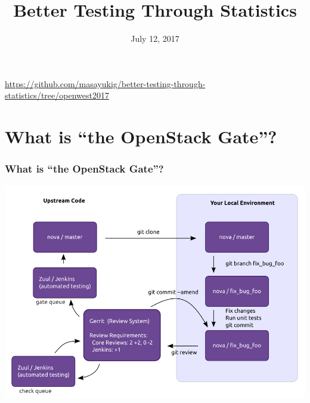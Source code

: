 \documentclass[aspectratio=169,11pt,hyperref={colorlinks=true}]{beamer}
\author[Matthew Treinish & Masayuki Igawa]{%
    \texorpdfstring{%
        \begin{columns}
            \column{.45\linewidth}
            \centering
            Matthew Treinish\\
            Open Source Developer Advocate - IBM
            \href{mailto:mtreinish@kortar.org}{mtreinish@kortar.org}\\
        \texttt{mtreinish on Freenode}
        \column{.45\linewidth}
            \centering
            Masayuki Igawa\\
            \href{mailto:masayuki.igawa@gmail.com}{masayuki.igawa@gmail.com}\\
            \texttt{masayukig on Freenode}
        \end{columns}
        }
    {Matthew Treinish & Masayuki Igawa}
}
\date{July 12, 2017}
\title[Better Testing Through Statistics
\hspace{2em}\insertframenumber/\inserttotalframenumber]{Better Testing Through Statistics}
\begin{document}
{%
\begin{frame}[noframenumbering]
    \hypersetup{colorlinks,urlcolor=white}
    \titlepage{}
    \centering
    \href{https://github.com/masayukig/better-testing-through-statistics/tree/openwest2017}{https://github.com/masayukig/better-testing-through-statistics/tree/openwest2017}
\end{frame}
}

\section{What is ``the OpenStack Gate''?}
\begin{frame}
    \frametitle{What is ``the OpenStack Gate''?}
	\begin{center}
		\includegraphics[width=.8\textwidth]{code_review.png}
	\end{center}
\end{frame}
\end{document}
